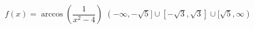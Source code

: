  {$f(x) = \arccos\left(\dfrac{1}{x^2-4}\right)$}
{ $(-\infty, -\sqrt{5}] \cup [-\sqrt{3}, \sqrt{3}] \cup [\sqrt{5}, \infty)$ }
